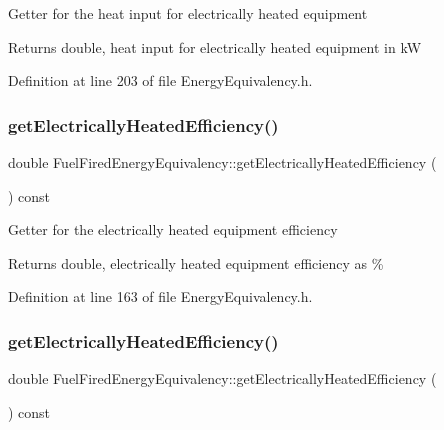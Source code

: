 Getter for the heat input for electrically heated equipment

\begin{DoxyReturn}{Returns}
double, heat input for electrically heated equipment in kW 
\end{DoxyReturn}


Definition at line 203 of file Energy\+Equivalency.\+h.

\mbox{\label{class_fuel_fired_energy_equivalency_ad4bd750677313895d8345c7eaf8308bd}} 
\subsubsection{\texorpdfstring{get\+Electrically\+Heated\+Efficiency()}{getElectricallyHeatedEfficiency()}\hspace{0.1cm}{\footnotesize\ttfamily [1/3]}}
{\footnotesize\ttfamily double Fuel\+Fired\+Energy\+Equivalency\+::get\+Electrically\+Heated\+Efficiency (\begin{DoxyParamCaption}{ }\end{DoxyParamCaption}) const\hspace{0.3cm}{\ttfamily [inline]}}

Getter for the electrically heated equipment efficiency

\begin{DoxyReturn}{Returns}
double, electrically heated equipment efficiency as \% 
\end{DoxyReturn}


Definition at line 163 of file Energy\+Equivalency.\+h.

\mbox{\label{class_fuel_fired_energy_equivalency_ad4bd750677313895d8345c7eaf8308bd}} 
\subsubsection{\texorpdfstring{get\+Electrically\+Heated\+Efficiency()}{getElectricallyHeatedEfficiency()}\hspace{0.1cm}{\footnotesize\ttfamily [2/3]}}
{\footnotesize\ttfamily double Fuel\+Fired\+Energy\+Equivalency\+::get\+Electrically\+Heated\+Efficiency (\begin{DoxyParamCaption}{ }\end{DoxyParamCaption}) const\hspace{0.3cm}{\ttfamily [inline]}}

